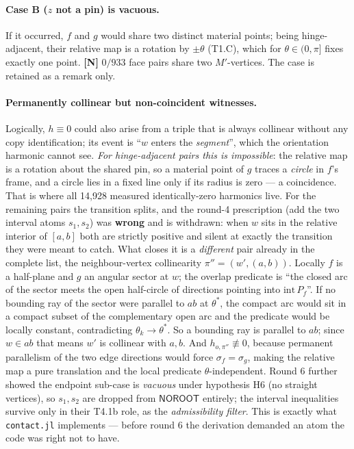 \documentclass[11pt,a4paper]{article}
\theoremstyle{definition}
\newcommand{\Mprime}{M'}
\newcommand{\file}[1]{\texttt{\small #1}}
\newcommand{\NOROOT}{\textsf{NOROOT}}
\begin{document}
\paragraph{Case B ($z$ not a pin) is vacuous.} If it occurred, $f$ and $g$ would share two
distinct material points; being hinge-adjacent, their relative map is a rotation by $\pm\theta$
(T1.C), which for $\theta\in(0,\pi]$ fixes exactly one point. \textbf{[N]} $0/933$ face pairs
share two $\Mprime$-vertices. The case is retained as a remark only.

\paragraph{Permanently collinear but non-coincident witnesses.} Logically, $h\equiv0$ could
also arise from a triple that is always collinear without any copy identification; its event
is ``$w$ enters the \emph{segment}'', which the orientation harmonic cannot see.
\emph{For hinge-adjacent pairs this is impossible}: the relative map is a rotation about the
shared pin, so a material point of $g$ traces a \emph{circle} in $f$'s frame, and a circle
lies in a fixed line only if its radius is zero --- a coincidence. That is where all 14{,}928
measured identically-zero harmonics live. For the remaining pairs the transition splits, and
the round-4 prescription (add the two interval atoms $s_1,s_2$) was \textbf{wrong} and is
withdrawn: when $w$ sits in the relative interior of $[a,b]$ both are strictly positive and
silent at exactly the transition they were meant to catch. What closes it is a
\emph{different} pair already in the complete list, the neighbour-vertex collinearity
$\pi''=(w',(a,b))$. Locally $f$ is a half-plane and $g$ an angular sector at $w$; the overlap
predicate is ``the closed arc of the sector meets the open half-circle of directions pointing
into $\mathrm{int}\,P_f$''. If no bounding ray of the sector were parallel to $ab$ at
$\theta^*$, the compact arc would sit in a compact subset of the complementary open arc and
the predicate would be locally constant, contradicting $\theta_k\to\theta^*$. So a bounding
ray is parallel to $ab$; since $w\in ab$ that means $w'$ is collinear with $a,b$. And
$h_{o,\pi''}\not\equiv0$, because permanent parallelism of the two edge directions would force
$\sigma_f=\sigma_g$, making the relative map a pure translation and the local predicate
$\theta$-independent. Round 6 further showed the endpoint sub-case is \emph{vacuous} under
hypothesis H6 (no straight vertices), so $s_1,s_2$ are dropped from $\NOROOT$ entirely; the
interval inequalities survive only in their T4.1b role, as the \emph{admissibility filter}.
This is exactly what \file{contact.jl} implements --- before round 6 the derivation demanded
an atom the code was right not to have.
\end{document}
